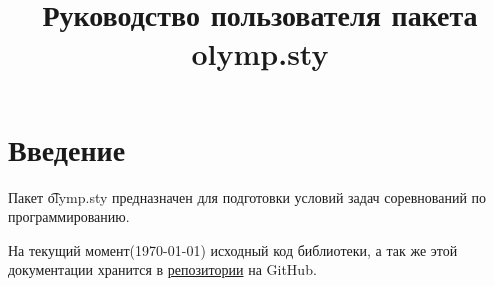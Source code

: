 \documentclass[11pt,a4paper,oneside]{article}
\begin{document}
\newcommand{\giturl}[1]{\href{https://github.com/GassaFM/olymp.sty}{#1}}

\title{Руководство пользователя пакета olymp.sty}
\author{}
\maketitle
\newpage

\section{Введение}

Пакет \t{olymp.sty} предназначен для подготовки условий задач
соревнований по программированию. 

На текущий момент(\today) исходный код библиотеки, а так же
этой документации хранится в \giturl{репозитории} на GitHub.
\end{document}
